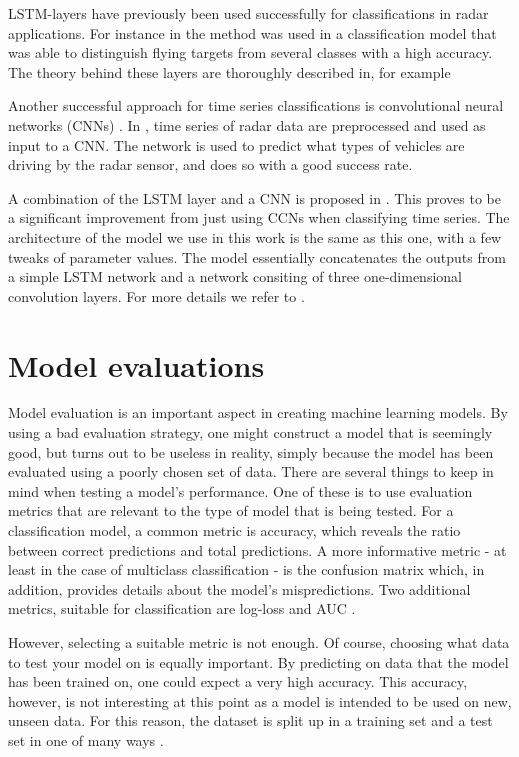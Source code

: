 LSTM-layers have previously been used successfully for classifications in radar applications. For instance in \citep{jithesh_sagayaraj_srinivasa_2018} the method was used in a classification model that was able to distinguish flying targets from several classes with a high accuracy. The theory behind these layers are thoroughly described in, for example \citep{hochreiter_schmidhuber_1997}

Another successful approach for time series classifications is convolutional neural networks (CNNs) \citep{karim_majumdar_darabi_chen_2018}. In \citep{capobianco_facheris_cuccoli_marinai_2017}, time series of radar data are preprocessed and used as input to a CNN. The network is used to predict what types of vehicles are driving by the radar sensor, and does so with a good success rate.


A combination of the LSTM layer and a CNN is proposed in \citep{karim_majumdar_darabi_chen_2018}. This proves to be a significant improvement from just using CCNs when classifying time series. The architecture of the model we use in this work is the same as this one, with a few tweaks of parameter values. The model essentially concatenates the outputs from a simple LSTM network and a network consiting of three one-dimensional convolution layers. For more details we refer to \citep{karim_majumdar_darabi_chen_2018}.


\section{Model evaluations}
Model evaluation is an important aspect in creating machine learning models. By using a bad evaluation strategy, one might construct a model that is seemingly good, but turns out to be useless in reality, simply because the model has been evaluated using a poorly chosen set of data. There are several things to keep in mind when testing a model's performance. One of these is to use evaluation metrics that are relevant to the type of model that is being tested. For a classification model, a common metric is accuracy, which reveals the ratio between correct predictions and total predictions. A more informative metric - at least in the case of multiclass classification - is the confusion matrix which, in addition, provides details about the model's mispredictions. Two additional metrics, suitable for classification are log-loss and AUC \citep{zheng_2015}. 

However, selecting a suitable metric is not enough. Of course, choosing what data to test your model on is equally important. By predicting on data that the model has been trained on, one could expect a very high accuracy. This accuracy, however, is not interesting at this point as a model is intended to be used on new, unseen data. For this reason, the dataset is split up in a training set and a test set in one of many ways \citep{raschka}.


